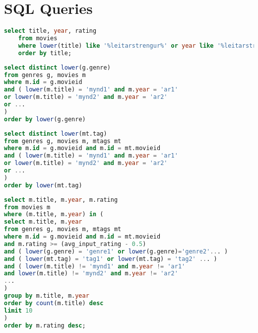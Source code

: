 \documentclass[12pt, git, draft]{rureport}
\begin{document}
\pagebreak
\appendix
\section{SQL Queries} \label{app:sql}
\begin{lstlisting}[language = SQL, caption = Finna myndir sem notanda líkar út frá leitarstreng, label=lst:Search]
	select title, year, rating
	from movies
	where lower(title) like '%leitarstrengur%' or year like '%leitarstrengur%'
	order by title;
\end{lstlisting}

\begin{lstlisting}[language = SQL, caption = Finna genres út frá titlum og ári titla, label = lst:genre]
select distinct lower(g.genre)
from genres g, movies m
where m.id = g.movieid
and ( lower(m.title) = 'mynd1' and m.year = 'ar1'
or lower(m.title) = 'mynd2' and m.year = 'ar2'
or ...
)
order by lower(g.genre)
\end{lstlisting}

\begin{lstlisting}[language = SQL, caption = Finna tags út frá titlum og ári titla, label = lst:tag]
select distinct lower(mt.tag)
from genres g, movies m, mtags mt
where m.id = g.movieid and m.id = mt.movieid
and ( lower(m.title) = 'mynd1' and m.year = 'ar1'
or lower(m.title) = 'mynd2' and m.year = 'ar2'
or ...
)
order by lower(mt.tag)
\end{lstlisting}

\begin{lstlisting}[language = SQL, caption = Finna líkar myndir, label = lst:simmovies]
select m.title, m.year, m.rating
from movies m
where (m.title, m.year) in (
select m.title, m.year
from genres g, movies m, mtags mt
where m.id = g.movieid and m.id = mt.movieid
and m.rating >= (avg_input_rating - 0.5)
and ( lower(g.genre) = 'genre1' or lower(g.genre)='genre2'... )
and ( lower(mt.tag) = 'tag1' or lower(mt.tag) = 'tag2' ... )
and ( lower(m.title) != 'mynd1' and m.year != 'ar1'
and lower(m.title) != 'mynd2' and m.year != 'ar2'
...
)
group by m.title, m.year
order by count(m.title) desc
limit 10
)
order by m.rating desc;
\end{lstlisting}


\clearpage
\printbibliography
\end{document}
